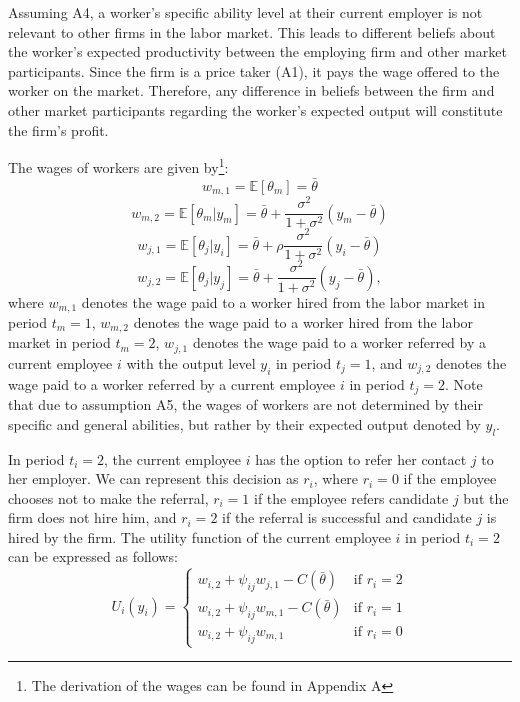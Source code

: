 \documentclass[12pt]{article}
\begin{document}
Assuming A4, a worker's specific ability level at their current employer is not relevant to other firms in the labor market. This leads to different beliefs about the worker's expected productivity between the employing firm and other market participants. Since the firm is a price taker (A1), it pays the wage offered to the worker on the market. Therefore, any difference in beliefs between the firm and other market participants regarding the worker's expected output will constitute the firm's profit.

The wages of workers are given by\footnote{The derivation of the wages can be found in Appendix A}:
\begin{equation}\label{eq_w_m_1}
    w_{m,1} = \mathbb{E}[\theta_{m}] = \bar{\theta}
\end{equation}
\begin{equation}\label{eq_w_m_2}
    w_{m,2} = \mathbb{E}[\theta_{m}|y_{m}] = \bar{\theta} + \frac{\sigma^2}{1+\sigma^2}(y_m - \bar{\theta})
\end{equation}
\begin{equation}\label{eq_w_j_1_y_i}
    w_{j,1} = \mathbb{E}[\theta_{j}|y_{i}] = \bar{\theta}+\rho\frac{\sigma^2}{1+\sigma^2}(y_i-\bar{\theta})
\end{equation}
\begin{equation}\label{eq_w_j_2}
    w_{j,2} = \mathbb{E}[\theta_j|y_j] = \bar{\theta}+\frac{\sigma^2}{1+\sigma^2}(y_j - \bar{\theta}),
\end{equation}
where $w_{m,1}$ denotes the wage paid to a worker hired from the labor market in period $t_m=1$, $w_{m,2}$ denotes the wage paid to a worker hired from the labor market in period $t_m=2$, $w_{j,1}$ denotes the wage paid to a worker referred by a current employee $i$ with the output level $y_i$ in period $t_j=1$, and $w_{j,2}$ denotes the wage paid to a worker referred by a current employee $i$ in period $t_j=2$. Note that due to assumption A5, the wages of workers are not determined by their specific and general abilities, but rather by their expected output denoted by $y_l$. 

In period $t_i = 2$, the current employee $i$ has the option to refer her contact $j$ to her employer. We can represent this decision as $r_i$, where $r_i = 0$ if the employee chooses not to make the referral, $r_i = 1$ if the employee refers candidate $j$ but the firm does not hire him, and $r_i = 2$ if the referral is successful and candidate $j$ is hired by the firm. The utility function of the current employee $i$ in period $t_i = 2$ can be expressed as follows:
\begin{equation}\label{eq:utilitiy}
        U_{i}(y_i) = 
        \begin{cases}
		w_{i,2} + \psi_{ij} w_{j,1} - C(\bar{\theta}) & \text{if } r_i = 2 \\
		w_{i,2} + \psi_{ij} w_{m,1} - C(\bar{\theta}) & \text{if } r_i = 1 \\
        w_{i,2} + \psi_{ij} w_{m,1} & \text{if } r_i = 0
        \end{cases}
\end{equation}
\end{document}
